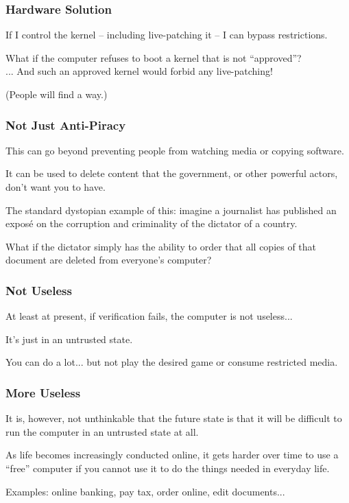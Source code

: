 \begin{frame}
\frametitle{Hardware Solution}

If I control the kernel -- including live-patching it -- I can bypass restrictions. 

What if the computer refuses to boot a kernel that is not ``approved''?\\
\quad... And such an approved kernel would forbid any live-patching!

(People will find a way.)

\end{frame}


\begin{frame}
\frametitle{Not Just Anti-Piracy}

This can go beyond preventing people from watching media or copying software.

It can be used to delete content that the government, or other powerful actors, don't want you to have. 

The standard dystopian example of this: imagine a journalist has published an expos\'e on the corruption and criminality of the dictator of a country.

What if the dictator simply has the ability to order that all copies of that document are deleted from everyone's computer?

\end{frame}


\begin{frame}
\frametitle{Not Useless}

At least at present, if verification fails, the computer is not useless...

It's just in an \alert{untrusted} state.

You can do a lot... but not play the desired game or consume restricted media.

\end{frame}


\begin{frame}
\frametitle{More Useless}

It is, however, not unthinkable that the future state is that it will be difficult to run the computer in an untrusted state at all.

As life becomes increasingly conducted online, it gets harder over time to use a ``free'' computer if you cannot use it to do the things needed in everyday life.

Examples: online banking, pay tax, order online, edit documents...

\end{frame}


